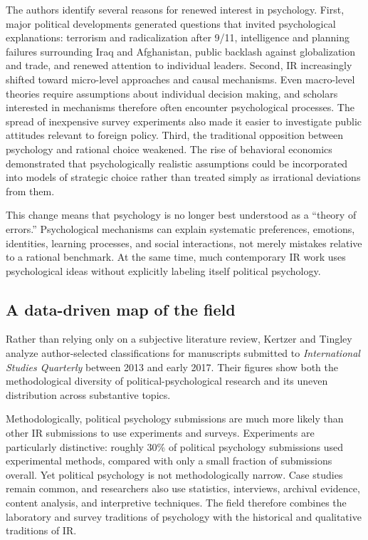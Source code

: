 The authors identify several reasons for renewed interest in psychology. First, major political developments generated questions that invited psychological explanations: terrorism and radicalization after 9/11, intelligence and planning failures surrounding Iraq and Afghanistan, public backlash against globalization and trade, and renewed attention to individual leaders. Second, IR increasingly shifted toward micro-level approaches and causal mechanisms. Even macro-level theories require assumptions about individual decision making, and scholars interested in mechanisms therefore often encounter psychological processes. The spread of inexpensive survey experiments also made it easier to investigate public attitudes relevant to foreign policy. Third, the traditional opposition between psychology and rational choice weakened. The rise of behavioral economics demonstrated that psychologically realistic assumptions could be incorporated into models of strategic choice rather than treated simply as irrational deviations from them.

This change means that psychology is no longer best understood as a ``theory of errors.'' Psychological mechanisms can explain systematic preferences, emotions, identities, learning processes, and social interactions, not merely mistakes relative to a rational benchmark. At the same time, much contemporary IR work uses psychological ideas without explicitly labeling itself political psychology.

\subsection{A data-driven map of the field}

Rather than relying only on a subjective literature review, Kertzer and Tingley analyze author-selected classifications for manuscripts submitted to \emph{International Studies Quarterly} between 2013 and early 2017. Their figures show both the methodological diversity of political-psychological research and its uneven distribution across substantive topics.

Methodologically, political psychology submissions are much more likely than other IR submissions to use experiments and surveys. Experiments are particularly distinctive: roughly 30\% of political psychology submissions used experimental methods, compared with only a small fraction of submissions overall. Yet political psychology is not methodologically narrow. Case studies remain common, and researchers also use statistics, interviews, archival evidence, content analysis, and interpretive techniques. The field therefore combines the laboratory and survey traditions of psychology with the historical and qualitative traditions of IR.


